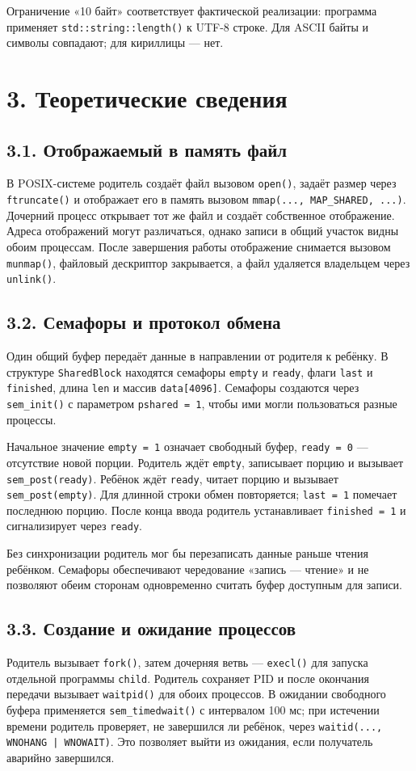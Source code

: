 \documentclass[12pt,a4paper]{article}
\begin{document}
Ограничение «10 байт» соответствует фактической реализации: программа применяет \texttt{std::string::length()} к UTF-8 строке. Для ASCII байты и символы совпадают; для кириллицы --- нет.

\section*{3. Теоретические сведения}
\subsection*{3.1. Отображаемый в память файл}
В POSIX-системе родитель создаёт файл вызовом \texttt{open()}, задаёт размер через \texttt{ftruncate()} и отображает его в память вызовом \texttt{mmap(..., MAP\_SHARED, ...)}. Дочерний процесс открывает тот же файл и создаёт собственное отображение. Адреса отображений могут различаться, однако записи в общий участок видны обоим процессам. После завершения работы отображение снимается вызовом \texttt{munmap()}, файловый дескриптор закрывается, а файл удаляется владельцем через \texttt{unlink()}.

\subsection*{3.2. Семафоры и протокол обмена}
Один общий буфер передаёт данные в направлении от родителя к ребёнку. В структуре \texttt{SharedBlock} находятся семафоры \texttt{empty} и \texttt{ready}, флаги \texttt{last} и \texttt{finished}, длина \texttt{len} и массив \texttt{data[4096]}. Семафоры создаются через \texttt{sem\_init()} с параметром \texttt{pshared = 1}, чтобы ими могли пользоваться разные процессы.

Начальное значение \texttt{empty = 1} означает свободный буфер, \texttt{ready = 0} --- отсутствие новой порции. Родитель ждёт \texttt{empty}, записывает порцию и вызывает \texttt{sem\_post(ready)}. Ребёнок ждёт \texttt{ready}, читает порцию и вызывает \texttt{sem\_post(empty)}. Для длинной строки обмен повторяется; \texttt{last = 1} помечает последнюю порцию. После конца ввода родитель устанавливает \texttt{finished = 1} и сигнализирует через \texttt{ready}.

Без синхронизации родитель мог бы перезаписать данные раньше чтения ребёнком. Семафоры обеспечивают чередование «запись --- чтение» и не позволяют обеим сторонам одновременно считать буфер доступным для записи.

\subsection*{3.3. Создание и ожидание процессов}
Родитель вызывает \texttt{fork()}, затем дочерняя ветвь --- \texttt{execl()} для запуска отдельной программы \texttt{child}. Родитель сохраняет PID и после окончания передачи вызывает \texttt{waitpid()} для обоих процессов. В ожидании свободного буфера применяется \texttt{sem\_timedwait()} с интервалом 100 мс; при истечении времени родитель проверяет, не завершился ли ребёнок, через \texttt{waitid(..., WNOHANG | WNOWAIT)}. Это позволяет выйти из ожидания, если получатель аварийно завершился.
\end{document}
